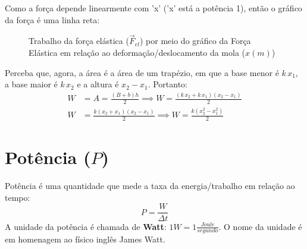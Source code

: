 \documentclass[12pt]{extarticle}
\newcommand{\<}{\langle}
\renewcommand{\>}{\rangle}
\theoremstyle{definition}
\begin{document}
Como a força depende linearmente com 'x' ('x' está a potência 1), então o gráfico da força é uma linha reta:
\begin{figure}[H]
    \centering
    \caption{Trabalho da força elástica ($\vec{F}_{el}$) por meio do gráfico da Força Elástica em relação ao deformação/deslocamento da mola ($x(m)$)}
    \label{fig:trabalho_elastica}
\end{figure}

Perceba que, agora, a área é a área de um trapézio, em que a base menor é $k\,x_1$, a base maior é $k\,x_2$ e a altura é $x_2-x_1$. Portanto:
\begin{equation}
   \begin{split}
        W &= A = \frac{(B+b)h}{2} \implies W = \frac{(k\,x_2+k\,x_1)(x_2-x_1)}{2} \\
        W &= \frac{k(x_2+x_1)(x_2-x_1)}{2}\implies \boxed{W = \frac{k(x_2^2-x_1^2)}{2}}
   \end{split}
\end{equation}

\section{Potência ($P$)}
Potência é uma quantidade que mede a taxa da energia/trabalho em relação ao tempo:
\begin{equation}
    P = \frac{W}{\Delta t}
\end{equation}
A unidade da potência é chamada de \textbf{Watt}: $1 W = 1\frac{Joule}{segundo}$. O nome da unidade é em homenagem ao físico inglês James Watt.
\end{document}
